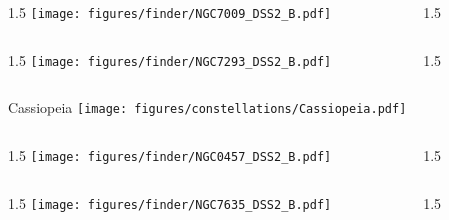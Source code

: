 \documentclass[final]{beamer}
\newlength{\colwidth}
\begin{document}
\begin{frame}[t]{}
  \begin{columns}[T]
    \begin{column}{1.5\colwidth}
      \centering
      \texttt{[image: figures/finder/NGC7009\_DSS2\_B.pdf]}
    \end{column}
    \begin{column}{1.5\colwidth}
      \Large
      
    \end{column}
  \end{columns}
  \vspace{\fill}
  \begin{columns}[T]
    \begin{column}{1.5\colwidth}
      \centering
      \texttt{[image: figures/finder/NGC7293\_DSS2\_B.pdf]}
    \end{column}
    \begin{column}{1.5\colwidth}
      \Large
      
    \end{column}
  \end{columns}
\end{frame}

\begin{frame}[t]{\LARGE Cassiopeia}
  \centering
  \texttt{[image: figures/constellations/Cassiopeia.pdf]}
\end{frame}


\begin{frame}[t]{}
  \begin{columns}[T]
    \begin{column}{1.5\colwidth}
      \centering
      \texttt{[image: figures/finder/NGC0457\_DSS2\_B.pdf]}
    \end{column}
    \begin{column}{1.5\colwidth}
      \Large
      
    \end{column}
  \end{columns}
  \vspace{\fill}
  \begin{columns}[T]
    \begin{column}{1.5\colwidth}
      \centering
      \texttt{[image: figures/finder/NGC7635\_DSS2\_B.pdf]}
    \end{column}
    \begin{column}{1.5\colwidth}
      \Large
      
    \end{column}
  \end{columns}
\end{frame}
\end{document}
